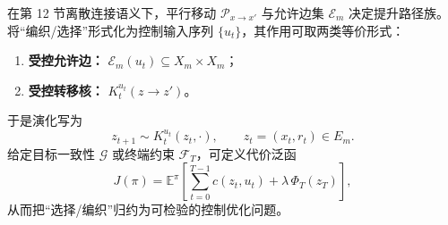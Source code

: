 在第 12 节离散连接语义下，平行移动 $\mathcal P_{x\to x'}$ 与允许边集 $\mathcal E_m$ 决定提升路径族。将“编织/选择”形式化为控制输入序列 $\{u_t\}$，其作用可取两类等价形式：
\begin{enumerate}
  \item \textbf{受控允许边：} $\mathcal E_m(u_t)\subseteq X_m\times X_m$；
  \item \textbf{受控转移核：} $K_t^{u_t}(z\to z')$。
\end{enumerate}
于是演化写为
$$
z_{t+1}\sim K_t^{u_t}(z_t,\cdot),\qquad z_t=(x_t,r_t)\in E_m.
$$
给定目标一致性 $\mathcal G$ 或终端约束 $\mathcal F_T$，可定义代价泛函
$$
J(\pi)=\mathbb E^{\pi}\left[\sum_{t=0}^{T-1} c(z_t,u_t)+\lambda\,\Phi_T(z_T)\right],
$$
从而把“选择/编织”归约为可检验的控制优化问题。
